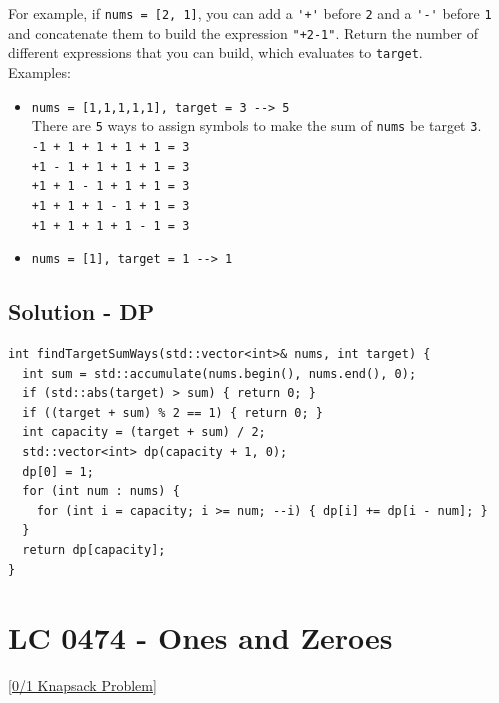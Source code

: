 For example, if {\colorbox{CodeBackground}{\lstinline|nums = [2, 1]|}}, you can add a {\colorbox{CodeBackground}{\lstinline|'+'|}} before {\colorbox{CodeBackground}{\lstinline|2|}} and a {\colorbox{CodeBackground}{\lstinline|'-'|}} before {\colorbox{CodeBackground}{\lstinline|1|}} and concatenate them to build the expression {\colorbox{CodeBackground}{\lstinline|"+2-1"|}}. Return the number of different expressions that you can build, which evaluates to {\colorbox{CodeBackground}{\lstinline|target|}}.\\

Examples:
\begin{itemize}
\item {\colorbox{CodeBackground}{\lstinline|nums = [1,1,1,1,1], target = 3 --> 5|}}\\
There are {\colorbox{CodeBackground}{\lstinline|5|}} ways to assign symbols to make the sum of {\colorbox{CodeBackground}{\lstinline|nums|}} be target {\colorbox{CodeBackground}{\lstinline|3|}}.\\
{\colorbox{CodeBackground}{\lstinline|-1 + 1 + 1 + 1 + 1 = 3|}} \\
{\colorbox{CodeBackground}{\lstinline|+1 - 1 + 1 + 1 + 1 = 3|}} \\
{\colorbox{CodeBackground}{\lstinline|+1 + 1 - 1 + 1 + 1 = 3|}} \\
{\colorbox{CodeBackground}{\lstinline|+1 + 1 + 1 - 1 + 1 = 3|}} \\
{\colorbox{CodeBackground}{\lstinline|+1 + 1 + 1 + 1 - 1 = 3|}}
\item {\colorbox{CodeBackground}{\lstinline|nums = [1], target = 1 --> 1|}}
\end{itemize}

\subsection*{Solution - DP}
\begin{lstlisting}
int findTargetSumWays(std::vector<int>& nums, int target) {
  int sum = std::accumulate(nums.begin(), nums.end(), 0);
  if (std::abs(target) > sum) { return 0; }
  if ((target + sum) % 2 == 1) { return 0; }
  int capacity = (target + sum) / 2;
  std::vector<int> dp(capacity + 1, 0);
  dp[0] = 1;
  for (int num : nums) {
    for (int i = capacity; i >= num; --i) { dp[i] += dp[i - num]; }
  }
  return dp[capacity];
}
\end{lstlisting}

\section{LC 0474 - Ones and Zeroes}\label{lc0474}
{\hyperref[subsubsec:01_knapsack_oj_problems]{[0/1 Knapsack Problem]}} \\

